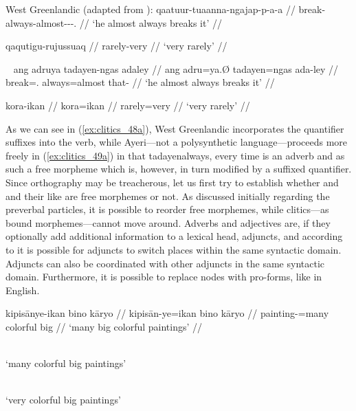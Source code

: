 \pex\label{ex:clitics_48}
West Greenlandic (adapted from \cite{bittner1995}):
\a\label{ex:clitics_48a}\begingl
	\gla qaatuur-tuaanna-ngajap-p-a-a //
	\glb break-always-almost-\Ind{}-\Tr{}-\Tsg{}.\Tsg{} //
	\glft `he almost always breaks it'  //
\endgl

\a\label{ex:clitics_48b}\begingl
	\gla qaqutigu-rujussuaq //
	\glb rarely-very //
	\glft `very rarely'  //
\endgl
\xe

\pex~\label{ex:clitics_49}
\a\label{ex:clitics_49a}\begingl
	\gla ang adruya tadayen-ngas adaley //
	\glb ang adru=ya.Ø tadayen=ngas ada-ley //
	\glc \AgtT{} break=\TsgM{}.\Top{} always=almost that-\PargI{} //
	\glft `he almost always breaks it' //
\endgl

\a\label{ex:clitics_49b}\begingl
	\gla kora-ikan //
	\glb kora=ikan //
	\glc rarely=very //
	\glft `very rarely' //
\endgl
\xe

As we can see in (\ref{ex:clitics_48a}), West Greenlandic incorporates the
quantifier suffixes into the verb, while Ayeri---not a polysynthetic 
language---proceeds more freely in (\ref{ex:clitics_49a}) in that 
{tadayen}{always, every time} is an adverb and as such a free morpheme which
is, however, in turn modified by a suffixed quantifier. Since orthography may
be treacherous, let us first try to establish whether
 and  and their
like are free morphemes or not. As discussed initially regarding the preverbal
particles, it is possible to reorder free morphemes, while clitics---as bound
morphemes---cannot move around. Adverbs and adjectives are, if they optionally
add additional information to a lexical head, adjuncts, and according to
\citet{carnie2013} it is possible for adjuncts to switch places within the same
syntactic domain. Adjuncts can also be coordinated with other adjuncts in the
same syntactic domain. Furthermore, it is possible to replace  nodes
with pro-forms, like  in English.

\pex\label{ex:clitics_50}
\a\label{ex:clitics_50a}\begingl
	\gla kipisānye-ikan bino kāryo //
	\glb kipisān-ye=ikan bino kāryo //
	\glc painting-\Pl{}=many colorful big //
	\glft `many big colorful paintings' //
\endgl

\a\label{ex:clitics_50b}  \\
	`many colorful big paintings'

\a\label{ex:clitics_50c} \ljudge{\excl}  \\
	`very colorful big paintings'

